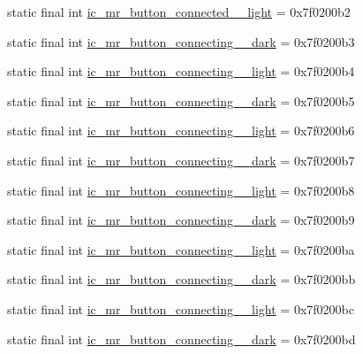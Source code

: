 \begin{CompactItemize}
static final int \hyperlink{classandroid_1_1support_1_1v7_1_1recyclerview_1_1_r_1_1drawable_fa1f96bf5a7d77de19f8704ebc122d23}{ic\_\-mr\_\-button\_\-connected\_\_\-light} = 0x7f0200b2
\item 
static final int \hyperlink{classandroid_1_1support_1_1v7_1_1recyclerview_1_1_r_1_1drawable_4a2f3eb245cf4387b86cb4a8472bebc2}{ic\_\-mr\_\-button\_\-connecting\_\_\-dark} = 0x7f0200b3
\item 
static final int \hyperlink{classandroid_1_1support_1_1v7_1_1recyclerview_1_1_r_1_1drawable_13e7e20e43464e1680fda73c39c57176}{ic\_\-mr\_\-button\_\-connecting\_\_\-light} = 0x7f0200b4
\item 
static final int \hyperlink{classandroid_1_1support_1_1v7_1_1recyclerview_1_1_r_1_1drawable_0900203155c676dc45a25fe4f877e843}{ic\_\-mr\_\-button\_\-connecting\_\_\-dark} = 0x7f0200b5
\item 
static final int \hyperlink{classandroid_1_1support_1_1v7_1_1recyclerview_1_1_r_1_1drawable_b42733ed5045577e73a216f7d8119868}{ic\_\-mr\_\-button\_\-connecting\_\_\-light} = 0x7f0200b6
\item 
static final int \hyperlink{classandroid_1_1support_1_1v7_1_1recyclerview_1_1_r_1_1drawable_82e407daaeab375abaee25b923abeee9}{ic\_\-mr\_\-button\_\-connecting\_\_\-dark} = 0x7f0200b7
\item 
static final int \hyperlink{classandroid_1_1support_1_1v7_1_1recyclerview_1_1_r_1_1drawable_62035afa9d614985aeddb5c313d9334b}{ic\_\-mr\_\-button\_\-connecting\_\_\-light} = 0x7f0200b8
\item 
static final int \hyperlink{classandroid_1_1support_1_1v7_1_1recyclerview_1_1_r_1_1drawable_2a571c9ac964fff43f22a1b5549202b7}{ic\_\-mr\_\-button\_\-connecting\_\_\-dark} = 0x7f0200b9
\item 
static final int \hyperlink{classandroid_1_1support_1_1v7_1_1recyclerview_1_1_r_1_1drawable_1a8ed0a36eee87a1178598fab222f90d}{ic\_\-mr\_\-button\_\-connecting\_\_\-light} = 0x7f0200ba
\item 
static final int \hyperlink{classandroid_1_1support_1_1v7_1_1recyclerview_1_1_r_1_1drawable_ebd058b31cdc58b9918275643eb0f69a}{ic\_\-mr\_\-button\_\-connecting\_\_\-dark} = 0x7f0200bb
\item 
static final int \hyperlink{classandroid_1_1support_1_1v7_1_1recyclerview_1_1_r_1_1drawable_2156ea7f25da2287175f1f3b7990b8fc}{ic\_\-mr\_\-button\_\-connecting\_\_\-light} = 0x7f0200bc
\item 
static final int \hyperlink{classandroid_1_1support_1_1v7_1_1recyclerview_1_1_r_1_1drawable_cc532f0e75d9573b4c4880edc3b17b13}{ic\_\-mr\_\-button\_\-connecting\_\_\-dark} = 0x7f0200bd

\end{CompactItemize}
